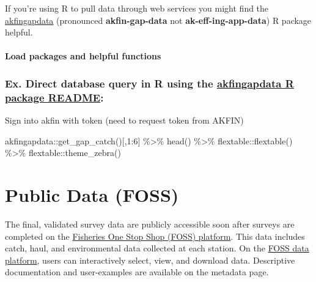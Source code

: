 \documentclass[
  letterpaper,
  oneside,
  open=any]{scrbook}
\newenvironment{Shaded}{\begin{snugshade}}{\end{snugshade}}
\newcommand{\DecValTok}[1]{\textcolor[rgb]{0.68,0.00,0.00}{#1}}
\newcommand{\FunctionTok}[1]{\textcolor[rgb]{0.28,0.35,0.67}{#1}}
\newcommand{\NormalTok}[1]{\textcolor[rgb]{0.00,0.23,0.31}{#1}}
\newcommand{\SpecialCharTok}[1]{\textcolor[rgb]{0.37,0.37,0.37}{#1}}
\begin{document}
If you're using R to pull data through web services you might find the
\href{https://github.com/MattCallahan-NOAA/akfingapdata/tree/main}{akfingapdata}
(pronounced \textbf{akfin-gap-data} not \textbf{ak-eff-ing-app-data}) R
package helpful.

\subsection{Load packages and helpful
functions}\label{load-packages-and-helpful-functions}

\section{\texorpdfstring{Ex. Direct database query in R using the
\href{https://github.com/MattCallahan-NOAA/akfingapdata/blob/main/README.Rmd}{akfingapdata
R package
README}:}{Ex. Direct database query in R using the akfingapdata R package README:}}\label{ex.-direct-database-query-in-r-using-the-akfingapdata-r-package-readme}

Sign into akfin with token (need to request token from AKFIN)

\begin{Shaded}
\begin{Highlighting}[]
\NormalTok{akfingapdata}\SpecialCharTok{::}\FunctionTok{get\_gap\_catch}\NormalTok{()[,}\DecValTok{1}\SpecialCharTok{:}\DecValTok{6}\NormalTok{] }\SpecialCharTok{\%\textgreater{}\%} 
  \FunctionTok{head}\NormalTok{() }\SpecialCharTok{\%\textgreater{}\%} 
\NormalTok{  flextable}\SpecialCharTok{::}\FunctionTok{flextable}\NormalTok{() }\SpecialCharTok{\%\textgreater{}\%}
\NormalTok{  flextable}\SpecialCharTok{::}\FunctionTok{theme\_zebra}\NormalTok{()}
\end{Highlighting}
\end{Shaded}

\part{Public Data (FOSS)}

The final, validated survey data are publicly accessible soon after
surveys are completed on the
\href{https://www.fisheries.noaa.gov/foss/}{Fisheries One Stop Shop
(FOSS) platform}. This data includes catch, haul, and environmental data
collected at each station. On the
\href{https://www.fisheries.noaa.gov/foss/}{FOSS data platform}, users
can interactively select, view, and download data. Descriptive
documentation and user-examples are available on the metadata page.
\end{document}
